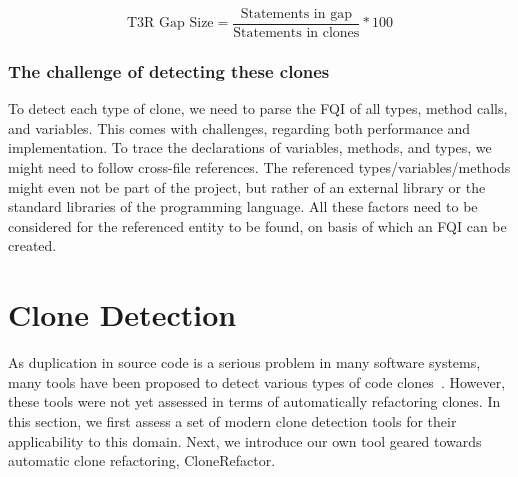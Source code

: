 \documentclass[a4paper]{article}
\begin{document}
\begin{equation}\label{eq:type3r}
\text{T3R Gap Size}=\frac{\text{Statements in gap}}{\text{Statements in clones}}*100
\end{equation}

\subsubsection{The challenge of detecting these clones}\label{chap:challenge}
To detect each type of clone, we need to parse the FQI of all types, method calls, and variables. This comes with challenges, regarding both performance and implementation. To trace the declarations of variables, methods, and types, we might need to follow cross-file references. The referenced types/variables/methods might even not be part of the project, but rather of an external library or the standard libraries of the programming language. All these factors need to be considered for the referenced entity to be found, on basis of which an FQI can be created.

\section{Clone Detection}\label{chap:clonedetection}
As duplication in source code is a serious problem in many software systems, many tools have been proposed to detect various types of code clones~\cite{sheneamer2016survey, svajlenko2014evaluating}. However, these tools were not yet assessed in terms of automatically refactoring clones. In this section, we first assess a set of modern clone detection tools for their applicability to this domain. Next, we introduce our own tool geared towards automatic clone refactoring, CloneRefactor.%
\end{document}
